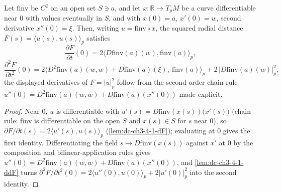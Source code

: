 \begin{lemma}
  \label{lem:dc-ch3-4-1-fidentity}


  Let $\mathrm{finv}$ be $C^2$ on an open set $S\ni a$, and let $x:\mathbb R\to T_pM$ be a
  curve differentiable near $0$ with values eventually in $S$, and with $x(0)=a$, $x'(0)=w$,
  second derivative $x''(0)=\xi$. Then, writing $u=\mathrm{finv}\circ x$, the squared radial
  distance $F(s)=\langle u(s),u(s)\rangle_p$ satisfies
  $$\frac{\partial F}{\partial t}(0)=2\langle D\mathrm{finv}(a)(w),\mathrm{finv}(a)\rangle_p,$$
  $$\frac{\partial^2 F}{\partial t^2}(0)
    =2\big\langle D^2\mathrm{finv}(a)(w,w)+D\mathrm{finv}(a)(\xi),\ \mathrm{finv}(a)\big\rangle_p
      +2\,\big|D\mathrm{finv}(a)(w)\big|_p^2,$$
  the displayed derivatives of $F=|u|_p^2$ follow from the second-order chain rule
  $u''(0)=D^2\mathrm{finv}(a)(w,w)+D\mathrm{finv}(a)(x''(0))$ made explicit.
\end{lemma}
\begin{proof}
  \sketch

  Near $0$, $u$ is differentiable with $u'(s)=D\mathrm{finv}(x(s))\big(x'(s)\big)$ (chain rule:
  $\mathrm{finv}$ is differentiable on the open $S$ and $x(s)\in S$ for $s$ near $0$), so
  $\partial F/\partial t(s)=2\langle u'(s),u(s)\rangle_p$ (\cref{lem:dc-ch3-4-1-dF}); evaluating
  at $0$ gives the first identity. Differentiating the field $s\mapsto D\mathrm{finv}(x(s))$
  against $x'$ at $0$ by the composition and bilinear-application rules gives
  $u''(0)=D^2\mathrm{finv}(a)(w,w)+D\mathrm{finv}(a)(x''(0))$, and \cref{lem:dc-ch3-4-1-ddF}
  turns $\partial^2 F/\partial t^2(0)=2\langle u''(0),u(0)\rangle_p+2|u'(0)|_p^2$ into the
  second identity.
\end{proof}

